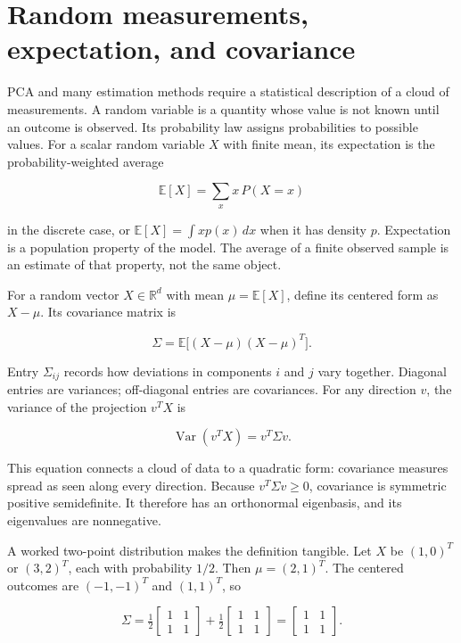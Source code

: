 \section{Random measurements, expectation, and covariance}\label{02-foundations-ii-ch022-random-measurements-expectation-and-covariance}

\hypertarget{02-foundations-ii-ch022-random-measurements-expectation-and-covariance}{}

PCA and many estimation methods require a statistical description of a cloud of measurements. A random variable is a quantity whose value is not known until an outcome is observed. Its probability law assigns probabilities to possible values. For a scalar random variable \(X\) with finite mean, its expectation is the probability-weighted average

\[
\mathbb E[X]=\sum_x x\,P(X=x)
\]

in the discrete case, or \(\mathbb E[X]=\int x p(x)\,dx\) when it has density \(p\). Expectation is a population property of the model. The average of a finite observed sample is an estimate of that property, not the same object.

For a random vector \(X\in\mathbb R^d\) with mean \(\mu=\mathbb E[X]\), define its centered form as \(X-\mu\). Its covariance matrix is

\[
\Sigma=\mathbb E\big[(X-\mu)(X-\mu)^T\big].
\]

Entry \(\Sigma_{ij}\) records how deviations in components \(i\) and \(j\) vary together. Diagonal entries are variances; off-diagonal entries are covariances. For any direction \(v\), the variance of the projection \(v^TX\) is

\[
\operatorname{Var}(v^TX)=v^T\Sigma v.
\]

This equation connects a cloud of data to a quadratic form: covariance measures spread as seen along every direction. Because \(v^T\Sigma v\ge 0\), covariance is symmetric positive semidefinite. It therefore has an orthonormal eigenbasis, and its eigenvalues are nonnegative.

A worked two-point distribution makes the definition tangible. Let \(X\) be \((1,0)^T\) or \((3,2)^T\), each with probability \(1/2\). Then \(\mu=(2,1)^T\). The centered outcomes are \((-1,-1)^T\) and \((1,1)^T\), so

\[
\Sigma=\tfrac12\begin{bmatrix}1&1\\1&1\end{bmatrix}
+\tfrac12\begin{bmatrix}1&1\\1&1\end{bmatrix}
=\begin{bmatrix}1&1\\1&1\end{bmatrix}.
\]

